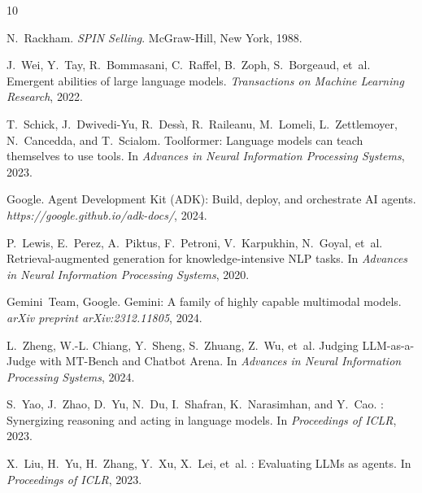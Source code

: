 \documentclass[10pt,twocolumn,a4paper]{article}
\begin{document}
\begin{thebibliography}{10}

N.~Rackham.
\newblock \emph{SPIN Selling}.
\newblock McGraw-Hill, New York, 1988.

J.~Wei, Y.~Tay, R.~Bommasani, C.~Raffel, B.~Zoph, S.~Borgeaud, et~al.
\newblock Emergent abilities of large language models.
\newblock \emph{Transactions on Machine Learning Research}, 2022.

T.~Schick, J.~Dwivedi-Yu, R.~Dess{\`\i}, R.~Raileanu, M.~Lomeli, L.~Zettlemoyer, N.~Cancedda, and T.~Scialom.
\newblock Toolformer: Language models can teach themselves to use tools.
\newblock In \emph{Advances in Neural Information Processing Systems}, 2023.

Google.
\newblock Agent Development Kit (ADK): Build, deploy, and orchestrate AI agents.
\newblock \emph{https://google.github.io/adk-docs/}, 2024.

P.~Lewis, E.~Perez, A.~Piktus, F.~Petroni, V.~Karpukhin, N.~Goyal, et~al.
\newblock Retrieval-augmented generation for knowledge-intensive {NLP} tasks.
\newblock In \emph{Advances in Neural Information Processing Systems}, 2020.

Gemini~Team, Google.
\newblock Gemini: A family of highly capable multimodal models.
\newblock \emph{arXiv preprint arXiv:2312.11805}, 2024.

L.~Zheng, W.-L. Chiang, Y.~Sheng, S.~Zhuang, Z.~Wu, et~al.
\newblock Judging {LLM}-as-a-{J}udge with {MT}-{B}ench and {C}hatbot {A}rena.
\newblock In \emph{Advances in Neural Information Processing Systems}, 2024.

S.~Yao, J.~Zhao, D.~Yu, N.~Du, I.~Shafran, K.~Narasimhan, and Y.~Cao.
: Synergizing reasoning and acting in language models.
\newblock In \emph{Proceedings of ICLR}, 2023.

X.~Liu, H.~Yu, H.~Zhang, Y.~Xu, X.~Lei, et~al.
: Evaluating {LLMs} as agents.
\newblock In \emph{Proceedings of ICLR}, 2023.

\end{thebibliography}
\end{document}
